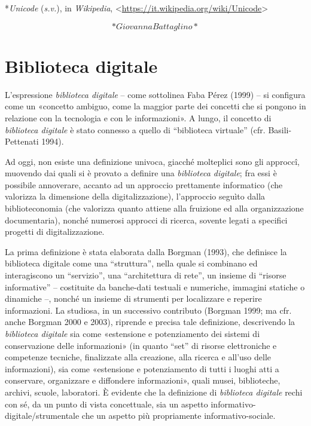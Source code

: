 \documentclass[
  b5paper,
  twoside,
  11pt,
  chapterprefix=false,
  bibliography=totocnumbered,
  listof=flat]{scrbook}
\begin{document}
*\emph{Unicode} (\emph{s.v.}), in \emph{Wikipedia},
\textless{}\href{https://it.wikipedia.org/wiki/Unicode}{{https://it.wikipedia.org/wiki/Unicode}}\textgreater{}

\[*Giovanna Battaglino*\]

\hypertarget{biblioteca-digitale}{%
\chapter{Biblioteca digitale}\label{biblioteca-digitale}}

L'espressione \emph{biblioteca digitale} -- come sottolinea Faba Pérez (1999)
-- si configura come un «concetto ambiguo, come la maggior parte dei
concetti che si pongono in relazione con la tecnologia e con le
informazioni». A lungo, il concetto di \emph{biblioteca digitale} è stato
connesso a quello di \enquote{biblioteca virtuale} (cfr. Basili-Pettenati 1994).

Ad oggi, non esiste una definizione univoca, giacché molteplici sono gli
approccî, muovendo dai quali si è provato a definire una \emph{biblioteca
digitale}; fra essi è possibile annoverare, accanto ad un approccio
prettamente informatico (che valorizza la dimensione della
digitalizzazione), l'approccio seguìto dalla biblioteconomia (che
valorizza quanto attiene alla fruizione ed alla organizzazione
documentaria), nonché numerosi approcci di ricerca, sovente legati a
specifici progetti di digitalizzazione.

La prima definizione è stata elaborata dalla Borgman (1993), che
definisce la biblioteca digitale come una \enquote{struttura}, nella quale si
combinano ed interagiscono un \enquote{servizio}, una \enquote{architettura di rete}, un
insieme di \enquote{risorse informative} -- costituite da banche-dati testuali e
numeriche, immagini statiche o dinamiche --, nonché un insieme di
strumenti per localizzare e reperire informazioni. La studiosa, in un
successivo contributo (Borgman 1999; ma cfr. anche Borgman 2000 e 2003),
riprende e precisa tale definizione, descrivendo la \emph{biblioteca
digitale} sia come «estensione e potenziamento dei sistemi di
conservazione delle informazioni» (in quanto \enquote{set} di risorse
elettroniche e competenze tecniche, finalizzate alla creazione, alla
ricerca e all'uso delle informazioni), sia come «estensione e
potenziamento di tutti i luoghi atti a conservare, organizzare e
diffondere informazioni», quali musei, biblioteche, archivi, scuole,
laboratori. È evidente che la definizione di \emph{biblioteca digitale} rechi
con sé, da un punto di vista concettuale, sia un aspetto
informativo-digitale/strumentale che un aspetto più propriamente
informativo-sociale.
\end{document}
